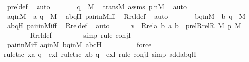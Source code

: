 \begin{isabellebody}
\ prel{\isacharunderscore}{\kern0pt}def\ \isamarkupfalse%
\ auto\isanewline
\ \ \ \ \isamarkupfalse%
\ \isamarkupfalse%
\ {\isachardoublequoteopen}q\ {\isasymin}\ M{\isachardoublequoteclose}\ \isamarkupfalse%
\ transM\ assms\ pinM\ \isamarkupfalse%
\ auto\isanewline
\ \ \ \ \isamarkupfalse%
\ \isamarkupfalse%
\ aqinM\ {\isacharcolon}{\kern0pt}\ {\isachardoublequoteopen}{\isacharless}{\kern0pt}a{\isacharcomma}{\kern0pt}\ q{\isachargreater}{\kern0pt}\ {\isasymin}\ M{\isachardoublequoteclose}\ \isamarkupfalse%
\ abqH\ pair{\isacharunderscore}{\kern0pt}in{\isacharunderscore}{\kern0pt}M{\isacharunderscore}{\kern0pt}iff\ \isamarkupfalse%
\ Rrel{\isacharunderscore}{\kern0pt}def\ \isamarkupfalse%
\ auto\isanewline
\ \ \ \ \isamarkupfalse%
\ \isamarkupfalse%
\ bqinM\ {\isacharcolon}{\kern0pt}\ {\isachardoublequoteopen}{\isacharless}{\kern0pt}b{\isacharcomma}{\kern0pt}\ q{\isachargreater}{\kern0pt}\ {\isasymin}\ M{\isachardoublequoteclose}\ \isamarkupfalse%
\ abqH\ pair{\isacharunderscore}{\kern0pt}in{\isacharunderscore}{\kern0pt}M{\isacharunderscore}{\kern0pt}iff\ \isamarkupfalse%
\ Rrel{\isacharunderscore}{\kern0pt}def\ \isamarkupfalse%
\ auto\isanewline
\isanewline
\ \ \ \ \isamarkupfalse%
\ {\isachardoublequoteopen}v\ {\isasymin}\ Rrel{\isacharparenleft}{\kern0pt}{\isasymlambda}a\ b{\isachardot}{\kern0pt}\ {\isasymlangle}a{\isacharcomma}{\kern0pt}\ b{\isasymrangle}\ {\isasymin}\ prel{\isacharparenleft}{\kern0pt}Rrel{\isacharparenleft}{\kern0pt}R{\isacharcomma}{\kern0pt}\ M{\isacharparenright}{\kern0pt}{\isacharcomma}{\kern0pt}\ p{\isacharparenright}{\kern0pt}{\isacharcomma}{\kern0pt}\ M{\isacharparenright}{\kern0pt}{\isachardoublequoteclose}\ \isanewline
\ \ \ \ \ \ \isamarkupfalse%
\ Rrel{\isacharunderscore}{\kern0pt}def\ \isanewline
\ \ \ \ \ \ \isamarkupfalse%
\ {\isacharparenleft}{\kern0pt}simp{\isacharcomma}{\kern0pt}\ rule\ conjI{\isacharparenright}{\kern0pt}\isanewline
\ \ \ \ \ \ \isamarkupfalse%
\ pair{\isacharunderscore}{\kern0pt}in{\isacharunderscore}{\kern0pt}M{\isacharunderscore}{\kern0pt}iff\ aqinM\ bqinM\ abqH\ \isanewline
\ \ \ \ \ \ \ \isamarkupfalse%
\ force\isanewline
\ \ \ \ \ \ \isamarkupfalse%
{\isacharparenleft}{\kern0pt}rule{\isacharunderscore}{\kern0pt}tac\ x{\isacharequal}{\kern0pt}{\isachardoublequoteopen}{\isacharless}{\kern0pt}a{\isacharcomma}{\kern0pt}\ q{\isachargreater}{\kern0pt}{\isachardoublequoteclose}\ \ exI{\isacharcomma}{\kern0pt}\ rule{\isacharunderscore}{\kern0pt}tac\ x{\isacharequal}{\kern0pt}{\isachardoublequoteopen}{\isacharless}{\kern0pt}b{\isacharcomma}{\kern0pt}\ q{\isachargreater}{\kern0pt}{\isachardoublequoteclose}\ \ exI{\isacharcomma}{\kern0pt}\ rule\ conjI{\isacharcomma}{\kern0pt}\ simp\ add{\isacharcolon}{\kern0pt}abqH{\isacharparenright}{\kern0pt}\isanewline

\end{isabellebody}

